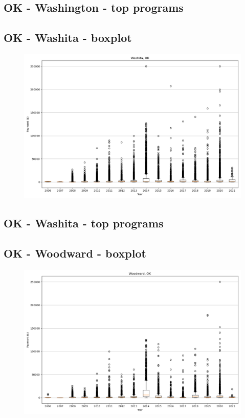 \subsection*{OK - Washington - top programs}

\newpage
\subsection*{OK - Washita - boxplot}
\begin{figure}[h]
\centering
\includegraphics[width=7in]{../output/boxplots/counties/Washita-OK_boxplot.png}
\end{figure}


\subsection*{OK - Washita - top programs}

\newpage
\subsection*{OK - Woodward - boxplot}
\begin{figure}[h]
\centering
\includegraphics[width=7in]{../output/boxplots/counties/Woodward-OK_boxplot.png}
\end{figure}


